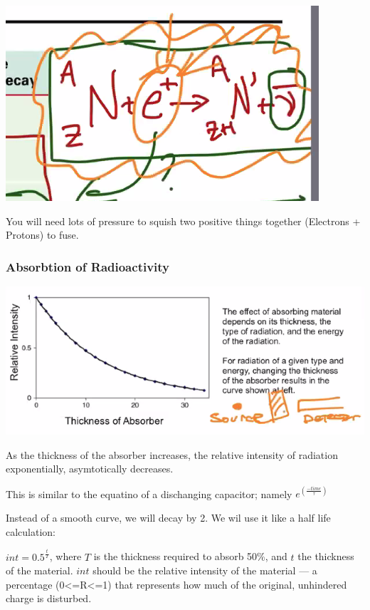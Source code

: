 \documentclass[letterpaper]{article}
\begin{document}
\begin{center}
\includegraphics[width=.9\linewidth]{positironcapture.png}
\end{center}

You will need lots of pressure to squish two positive things together
(Electrons + Protons) to fuse.

\subsubsection{Absorbtion of Radioactivity}
\label{sec:org7800b08}
\begin{center}
\includegraphics[width=.9\linewidth]{absorbtion.png}
\end{center}

As the thickness of the absorber increases, the relative intensity of
radiation exponentially, asymtotically decreases.

This is similar to the equatino of a dischanging capacitor; namely
\(e^(\frac{-time}{\tau})\)

Instead of a smooth curve, we will decay by 2. We wil use it like a half
life calculation:

\(int = 0.5^{\frac{t}{T}}\), where \(T\) is the thickness required to
absorb 50\%, and \(t\) the thickness of the material. \(int\) should be
the relative intensity of the material --- a percentage (0<=R<=1) that
represents how much of the original, unhindered charge is disturbed.
\end{document}
